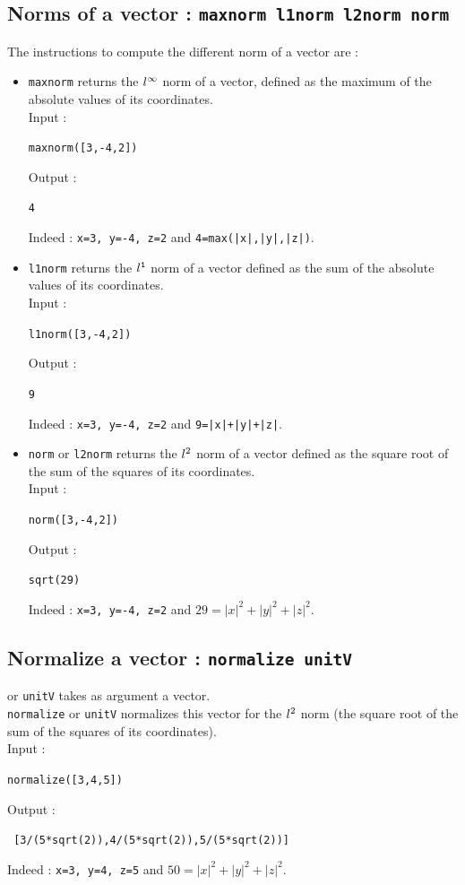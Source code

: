 \documentclass[a4paper,11pt]{book}
\begin{document}
\subsection{Norms of a vector : {\tt maxnorm l1norm l2norm
norm}}
The instructions to compute the different norm of a vector are :
\begin{itemize}
\item{\tt maxnorm} returns the ${\mathnormal{l}}^\infty$ norm of a
vector, 
defined as the maximum of the absolute values of its 
coordinates\label{sec:maxnormv}.\\
Input :
\begin{center}{\tt maxnorm([3,-4,2])}\end{center}
Output :
\begin{center}{\tt 4}\end{center}
Indeed : {\tt x=3, y=-4, z=2} and  {\tt 4=max(|x|,|y|,|z|)}.
\item{\tt l1norm}  returns the ${\tt {\mathnormal{l}}^1}$ norm of a 
vector defined as the sum of  the absolute values of its 
coordinates\label{sec:l1normv}.\\
Input :
\begin{center}{\tt l1norm([3,-4,2])}\end{center}
Output :
\begin{center}{\tt 9}\end{center}
Indeed : {\tt x=3, y=-4, z=2} and  {\tt 9=|x|+|y|+|z|}.
\item{\tt norm} or  {\tt l2norm}  returns the 
 ${\mathnormal{l}}^2$ norm of a vector defined as the square root 
of the sum of the squares of its 
coordinates\label{sec:l2normv}.\\
Input :
\begin{center}{\tt norm([3,-4,2])}\end{center}
Output :
\begin{center}{\tt sqrt(29)}\end{center}
Indeed : {\tt x=3, y=-4, z=2} and  $ 29=|x|^2+|y|^2+|z|^2$.
\end{itemize}

\subsection{Normalize a vector : {\tt normalize
unitV}}
 or {\tt unitV} takes as argument a vector.\\
 {\tt normalize} or {\tt unitV}  normalizes this  vector for the 
${\mathnormal{l}}^2$ norm
(the square root of the sum of the squares of its coordinates).\\
Input :
\begin{center}{\tt normalize([3,4,5])}\end{center}
Output :
\begin{center}{\tt
[3/(5*sqrt(2)),4/(5*sqrt(2)),5/(5*sqrt(2))]}\end{center}
Indeed : {\tt x=3, y=4, z=5} and  $ 50=|x|^2+|y|^2+|z|^2$.
\end{document}
